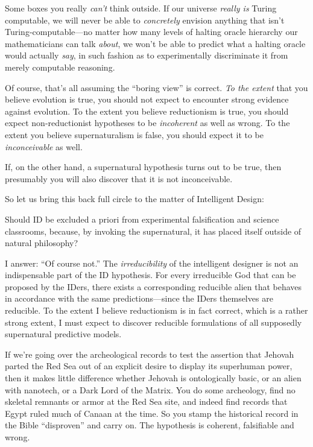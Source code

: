 {
 Some boxes you really \textit{can't} think
outside. If our universe \textit{really is} Turing computable, we will
never be able to \textit{concretely} envision anything that
isn't Turing-computable---no matter how many levels of
halting oracle hierarchy our mathematicians can talk \textit{about}, we
won't be able to predict what a halting oracle would
actually \textit{say}, in such fashion as to experimentally
discriminate it from merely computable reasoning.}

{
 Of course, that's all assuming the
``boring view'' is correct.
\textit{To the extent} that you believe evolution is true, you should
not expect to encounter strong evidence against evolution. To the
extent you believe reductionism is true, you should expect
non-reductionist hypotheses to be \textit{incoherent} as well as wrong.
To the extent you believe supernaturalism is false, you should expect
it to be \textit{inconceivable} as well.}

{
 If, on the other hand, a supernatural hypothesis turns out to be
true, then presumably you will also discover that it is not
inconceivable.}

{
 So let us bring this back full circle to the matter of Intelligent
Design:}

{
 Should ID be excluded a priori from experimental falsification and
science classrooms, because, by invoking the supernatural, it has
placed itself outside of natural philosophy?}

{
 I answer: ``Of course not.''
The \textit{irreducibility} of the intelligent designer is not an
indispensable part of the ID hypothesis. For every irreducible God that
can be proposed by the IDers, there exists a corresponding reducible
alien that behaves in accordance with the same predictions---since the
IDers themselves are reducible. To the extent I believe reductionism is
in fact correct, which is a rather strong extent, I must expect to
discover reducible formulations of all supposedly supernatural
predictive models.}

{
 If we're going over the archeological records to
test the assertion that Jehovah parted the Red Sea out of an explicit
desire to display its superhuman power, then it makes little difference
whether Jehovah is ontologically basic, or an alien with nanotech, or a
Dark Lord of the Matrix. You do some archeology, find no skeletal
remnants or armor at the Red Sea site, and indeed find records that
Egypt ruled much of Canaan at the time. So you stamp the historical
record in the Bible ``disproven''
and carry on. The hypothesis is coherent, falsifiable and wrong.}

